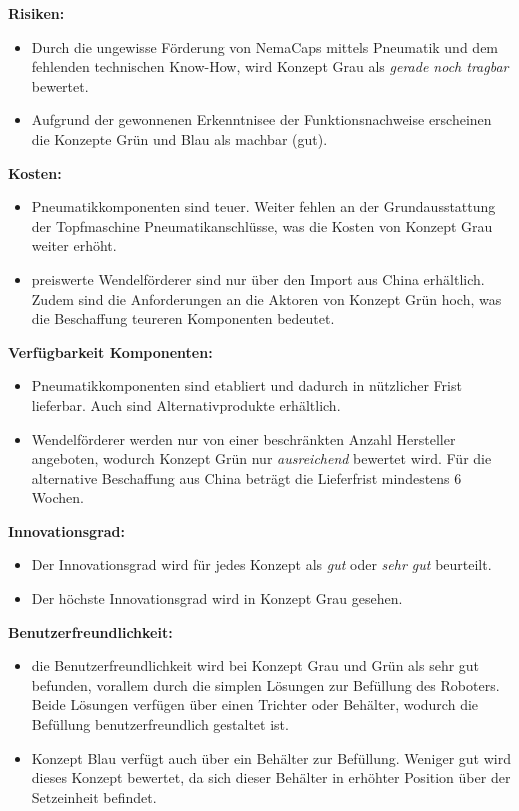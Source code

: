 \textbf{Risiken:}
\begin{itemize}
	\item Durch die ungewisse Förderung von NemaCaps mittels Pneumatik und dem fehlenden technischen Know-How, wird Konzept Grau als \textit{gerade noch tragbar} bewertet.
	
	\item Aufgrund der gewonnenen Erkenntnisee der Funktionsnachweise erscheinen die Konzepte Grün und Blau als machbar (gut). 
\end{itemize}

\textbf{Kosten:}
\begin{itemize}
	\item Pneumatikkomponenten sind teuer. Weiter fehlen an der Grundausstattung der Topfmaschine Pneumatikanschlüsse, was die Kosten von Konzept Grau weiter erhöht.
	
	\item preiswerte Wendelförderer sind nur über den Import aus China erhältlich. Zudem sind die Anforderungen an die Aktoren von Konzept Grün hoch, was die Beschaffung teureren Komponenten bedeutet.  
\end{itemize}

\textbf{Verfügbarkeit Komponenten:}
\begin{itemize}
	\item Pneumatikkomponenten sind etabliert und dadurch in nützlicher Frist lieferbar. Auch sind Alternativprodukte erhältlich. 
		
	\item Wendelförderer werden nur von einer beschränkten Anzahl Hersteller angeboten, wodurch Konzept Grün nur \textit{ausreichend} bewertet wird. Für die alternative Beschaffung aus China beträgt die Lieferfrist mindestens 6 Wochen.
\end{itemize}

\textbf{Innovationsgrad:}
\begin{itemize}
	\item Der Innovationsgrad wird für jedes Konzept als \textit{gut} oder \textit{sehr gut} beurteilt.
	
	\item Der höchste Innovationsgrad wird in Konzept Grau gesehen.
\end{itemize}

\textbf{Benutzerfreundlichkeit:}
\begin{itemize}
	\item die Benutzerfreundlichkeit wird bei Konzept Grau und Grün als sehr gut befunden, vorallem durch die simplen Lösungen zur Befüllung des Roboters. Beide Lösungen verfügen über einen Trichter oder Behälter, wodurch die Befüllung benutzerfreundlich gestaltet ist.
	
	\item Konzept Blau verfügt auch über ein Behälter zur Befüllung. Weniger gut wird dieses Konzept bewertet, da sich dieser Behälter in erhöhter Position über der Setzeinheit befindet.
\end{itemize}

